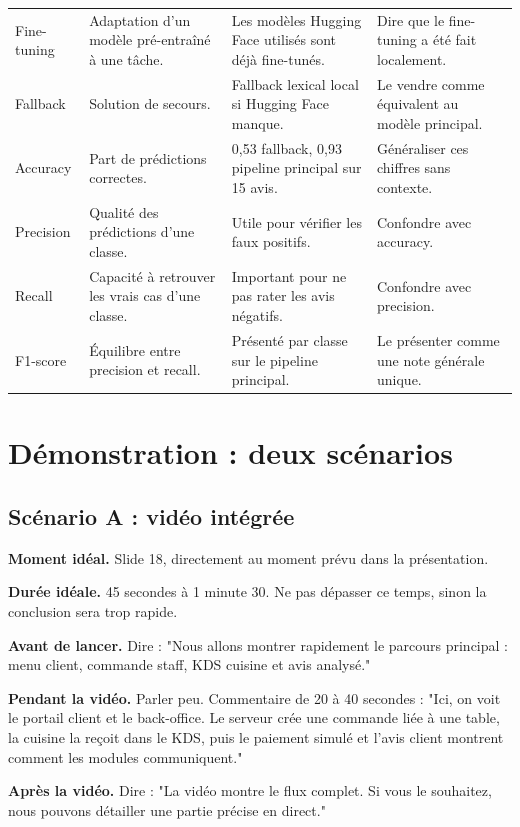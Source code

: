 \documentclass[11pt,a4paper]{article}
\begin{document}
\begin{longtable}{p{2.8cm}p{4cm}p{4cm}p{4cm}}
Fine-tuning & Adaptation d'un modèle pré-entraîné à une tâche. & Les modèles Hugging Face utilisés sont déjà fine-tunés. & Dire que le fine-tuning a été fait localement.\\
Fallback & Solution de secours. & Fallback lexical local si Hugging Face manque. & Le vendre comme équivalent au modèle principal.\\
Accuracy & Part de prédictions correctes. & 0,53 fallback, 0,93 pipeline principal sur 15 avis. & Généraliser ces chiffres sans contexte.\\
Precision & Qualité des prédictions d'une classe. & Utile pour vérifier les faux positifs. & Confondre avec accuracy.\\
Recall & Capacité à retrouver les vrais cas d'une classe. & Important pour ne pas rater les avis négatifs. & Confondre avec precision.\\
F1-score & Équilibre entre precision et recall. & Présenté par classe sur le pipeline principal. & Le présenter comme une note générale unique.\\
\bottomrule
\end{longtable}

\section{Démonstration : deux scénarios}

\subsection{Scénario A : vidéo intégrée}

\textbf{Moment idéal.} Slide 18, directement au moment prévu dans la présentation.

\textbf{Durée idéale.} 45 secondes à 1 minute 30. Ne pas dépasser ce temps, sinon la conclusion sera trop rapide.

\textbf{Avant de lancer.} Dire : "Nous allons montrer rapidement le parcours principal : menu client, commande staff, KDS cuisine et avis analysé."

\textbf{Pendant la vidéo.} Parler peu. Commentaire de 20 à 40 secondes : "Ici, on voit le portail client et le back-office. Le serveur crée une commande liée à une table, la cuisine la reçoit dans le KDS, puis le paiement simulé et l'avis client montrent comment les modules communiquent."

\textbf{Après la vidéo.} Dire : "La vidéo montre le flux complet. Si vous le souhaitez, nous pouvons détailler une partie précise en direct."
\end{document}
